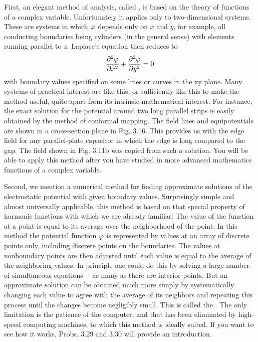 First, an elegant method of analysis, called ,
is based on the theory of functions of a complex variable. Unfortunately
it applies only to two-dimensional systems. These are systems
in which $\varphi$ depends only on $x$ and $y$, for example, all conducting
boundaries being cylinders (in the general sense) with elements
running parallel to $z$. Laplace's equation then reduces to
\begin{equation}
  \frac{\partial^2\varphi}{\partial x^2}+\frac{\partial^2\varphi}{\partial y^2}=0
\end{equation}
with boundary values specified on some lines or curves in the xy
plane. Many systems of practical interest are like this, or sufficiently
like this to make the method useful, quite apart from its intrinsic
mathematical interest. For instance, the exact solution for the potential
around two long parallel strips is easily obtained by the
method of conformal mapping. The field lines and equipotentials
are shown in a cross-section plane in Fig. 3.16. This provides us
with the edge field for any parallel-plate capacitor in which the edge
is long compared to the gap. The field shown in Fig. 3.11b was
copied from such a solution. You will be able to apply this method
after you have studied in more advanced mathematics functions of
a complex variable.

Second, we mention a numerical method for finding approximate
solutions of the electrostatic potential with given boundary values.
Surprisingly simple and almost universally applicable, this method
is based on that special property of harmonic functions with which
we are already familiar: The value of the function at a point is equal
to its average over the neighborhood of the point. In this method
the potential function $\varphi$ is represented by values at an array of discrete
points only, including discrete points on the boundaries. The
values at nonboundary points are then adjusted until each value is
equal to the average of the neighboring values. In principle one
could do this by solving a large number of simultaneous equations---
as many as there are interior points. But an approximate solution
can be obtained much more simply by systematically changing each
value to agree with the average of its neighbors and repeating this
process until the changes become negligibly small. This is called
the . The only limitation is the patience of the
computer, and that has been eliminated by high-speed computing
machines, to which this method is ideally suited. If you want to see
how it works, Probs. 3.29 and 3.30 will provide an introduction.

